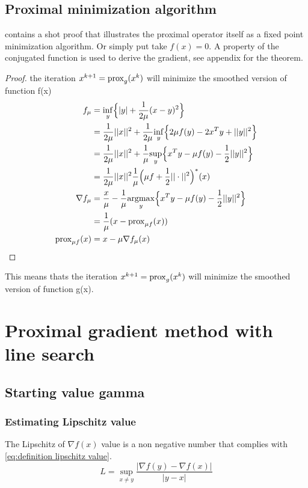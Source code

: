 	\subsection{Proximal minimization algorithm}
		 \cite{QianYang} contains a shot proof that illustrates the proximal operator itself as a fixed point minimization algorithm. Or simply put take $f(x)=0$.  A property of the conjugated function is used to derive the gradient, see appendix for the theorem.
		 \begin{proof}
		 	the iteration $x^{k+1}=\operatorname{prox}_g(x^k)$ will minimize the smoothed version of function f(x) 
		 	\begin{align*}
		 	f_{\mu}
		 	&= \underset{y}{\inf}\Big\{ |y| +\frac{1}{2 \mu}(x-y)^2 \Big\} \\
		 	&=   \frac{1}{2 \mu}||x||^2 + \frac{1}{2\mu} 
		 	\underset{y}{\inf}\Big\{
		 	2 \mu f(y) - 2x^T y + ||y||^2
		 	\Big\} \\
		 	&=  \frac{1}{2 \mu}||x||^2 + \frac{1}{\mu} 
		 	\underset{y}{\sup}\Big\{
		 	x^T y  - \mu f(y) - \frac{1}{2} ||y||^2 \Big \} \\
		 	&= \frac{1}{2\mu }||x||^2 \frac{1}{\mu } \Big( \mu f + \frac{1}{2}||\cdot||^2 \Big)^* (x) \\
		 	\nabla  f_{\mu} 
		 	&= \frac{x}{\mu} - \frac{1}{\mu} \underset{y}{\operatorname{argmax}} 
		 	\Big \{ x^Ty - \mu f(y) - \frac{1}{2}||y||^2 \Big \}\\
		 	& = \frac{1}{\mu}(x - \operatorname{prox}_{\mu f}(x)) \\
		 	\operatorname{prox}_{\mu f}(x)
		 	& = x- \mu \nabla f_{\mu}(x)
		 	\end{align*}
		 	\label{prf:proximal minimiztion alg proof}
		 \end{proof}

		 This means thats the iteration $x^{k+1}=\operatorname{prox}_g(x^k)$ will minimize the smoothed version of function g(x). 

\section{Proximal gradient method with line search}
	\subsection{Starting value gamma }
		\subsubsection{Estimating Lipschitz value}
			The Lipschitz of $\nabla f(x)$ value is a non negative number that complies with \eqref{eq:definition lipschitz value}.
			\begin{equation}
			L = \underset{x \neq y}{\sup} \frac{|\nabla f(y)-\nabla f(x)|}{|y-x|}
			\label{eq:definition lipschitz value}
			\end{equation}
			
